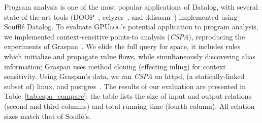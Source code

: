 \documentclass[nonacm,sigplan]{acmart}
\newcommand{\tool}{\textsc{GPUlog}}
\begin{document}
Program analysis is one of the most popular applications of Datalog, with several state-of-the-art tools (DOOP~\cite{bravenboer2009doop}, cclyzer~\cite{balatsouras2016cclyzer}, and ddisasm~\cite{flores2020ddisasm}) implemented using Souffl\'e Datalog. To evaluate \tool{}'s potential application to program analysis, we implemented context-sensitive points-to analysis (\textit{CSPA}), reproducing the experiments of Graspan~\cite{Wang2017GraspanAS}. We elide the full query for space, it includes rules which initialize and propagate value flows, while simultaneously discovering alias information; Graspan uses method cloning (effecting inling) for context sensitivity.
%
%
%
Using Graspan's data, we ran \textit{CSPA} on \textsf{httpd}, 
(a statically-linked subset of) \textsf{linux}, and \textsf{postgres}~\cite{Wang2017GraspanAS}. The results of our evaluation are presented in Table~\ref{tab:cspa_compare}; the table lists the size of input and output relations (second and third columns) and total running time (fourth column). All relation sizes match that of Souff\'e's.
\end{document}
